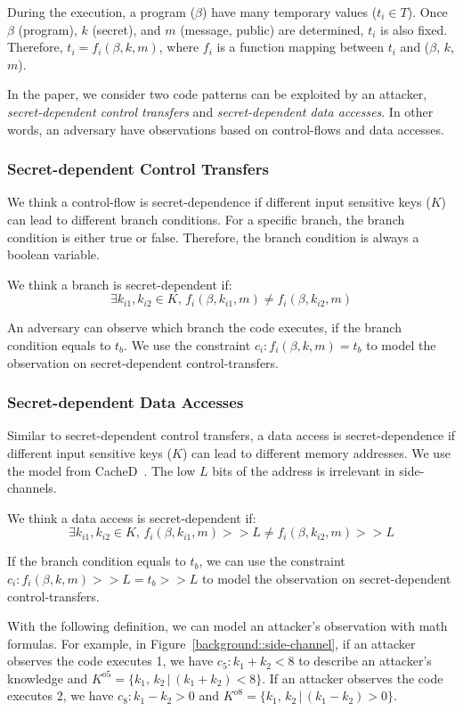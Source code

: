 During the execution, a program ($\beta$) have many temporary values ($t_i \in T$).
Once $\beta$ (program), $k$ (secret), and $m$ (message, public) are determined,
$t_i$ is also fixed. Therefore, 
$ t_i = f_i(\beta, k, m)$, where
$f_ i$ is a function mapping 
between $t_i$ and ($\beta$, $k$, $m$). 

In the paper, we consider two code patterns can be exploited by an attacker, 
\emph{secret-dependent control transfers} and \emph{secret-dependent data accesses}.
In other words, an adversary have observations based on control-flows and
data accesses.

\subsubsection{Secret-dependent Control Transfers}
We think a control-flow is secret-dependence if different input sensitive keys ($K$)
can lead to different branch conditions. For a specific branch, the branch
condition is either true or false. Therefore, the branch condition is always a
boolean variable. 

We think a branch is secret-dependent if:
$$\exists k_{i1}, k_{i2} \in K, \,f_i(\beta, k_{i1}, m) \neq f_i(\beta, k_{i2}, m)$$

An adversary can observe which branch the code executes, if the branch condition
equals to $t_b$. We use the constraint $c_i : f_i(\beta, k, m) = t_b$ to model the
observation on secret-dependent control-transfers. 

\subsubsection{Secret-dependent Data Accesses}
Similar to secret-dependent control transfers, a data access is secret-dependence 
if different input sensitive keys ($K$) can lead to different memory addresses.
We use the model from CacheD~\cite{203878}. The low $L$ bits of the address is irrelevant
in side-channels. 

We think a data access is secret-dependent if:
$$\exists k_{i1}, k_{i2} \in K, \,f_i(\beta, k_{i1}, m) >> L \neq f_i(\beta, k_{i2}, m) >> L$$

If the branch condition equals to $t_b$,
we can use the constraint $c_i : f_i(\beta, k, m) >> L = t_b >> L$ to model the
observation on secret-dependent control-transfers. 

With the following definition, we can model an attacker's observation with math formulas.
For example, in Figure~\ref{background::side-channel}, if an attacker observes
the code executes 1, we have $c_5: k_1 + k_2 < 8$ to describe an
attacker's knowledge and $K^{o5} = \{k_1,\, k_2\,|\, (k_1 + k_2) < 8\}$. If an attacker observes
the code executes 2, we have $c_8: k_1 - k_2 > 0$ 
and $K^{o8} = \{k_1,\, k_2\,|\, (k_1 - k_2) > 0\}$. 
